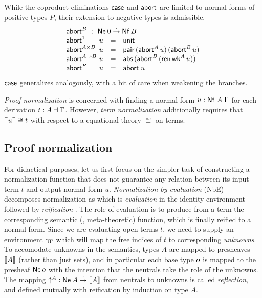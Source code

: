 \documentclass[a4paper,USenglish,cleveref, autoref]{lipics-v2019}
\begin{document}
While the coproduct eliminations $\mathsf{case}$ and $\mathsf{abort}$ are limited to
normal forms of positive types $P$, their extension to negative types
is admissible.
\[
\begin{array}{l@{~}lcl}
  \multicolumn 4 l {\tabort^B ~:~ \tNe\, 0 \todot \tNf\,B} \\
  \tabort^{\tyone}     & u & = & \tunit \\
  \tabort^{A \times B} & u & = & \tpair\,(\tabort^A\,u)\,(\tabort^B\,u) \\
  \tabort^{A \To B}    & u & = & \tabs\,(\tabort^B\,(\tren\,\twk^A\,u)) \\
  \tabort^P           & u & = & \tabort\;u \\
\end{array}
\]
$\mathsf{case}$ generalizes analogously, with a bit of care when weakening
the branches.

\emph{Proof normalization} is concerned with finding a normal form
$u : \mathsf{Nf}\;A\;\Gamma$ for each derivation $t : A \dashv \Gamma$.  However,
\emph{term normalization} additionally requires that $\ulcorner u\urcorner \cong t$
with respect to a equational theory $\cong$ on terms.

\subsection{Proof normalization}

For didactical purposes, let us first focus on the simpler task of
constructing a normalization function
that does not guarantee any relation between its input term $t$ and
output normal form $u$.
\emph{Normalization by evaluation} (NbE) decomposes normalization as
which is
\emph{evaluation}
in the identity environment \nofbox{$\idenv\Gamma : \den \Gamma \Gamma$}
followed by
\emph{reification}
.
The role of evaluation is to produce from a term the corresponding
semantic (\ie, meta-theoretic) function, which is finally reified to a normal form.
Since we are evaluating open terms $t$, we need to supply an environment
$\gamma_{\Gamma}$ which will map the free indices of $t$ to corresponding
\emph{unknowns}.  To accomodate unknowns in the semantics, types $A$
are mapped to presheaves $\mathopen{{[\kern-0.14em[}} A \mathclose{{]\kern-0.14em]}}$ (rather than just sets), and in
particular each base type $o$ is mapped to the presheaf
$\mathsf{Ne}^{}\,o$ with the intention that the neutrals take the role of
the unknowns.  The mapping $\mathord{\uparrow_{}^{A}} : \mathsf{Ne}^{}\,A \stackrel{\cdot}{\to} \mathopen{{[\kern-0.14em[}} A \mathclose{{]\kern-0.14em]}}$ from
neutrals to unknowns is called \emph{reflection}, and defined mutually
with reification by induction on type $A$.
\end{document}
